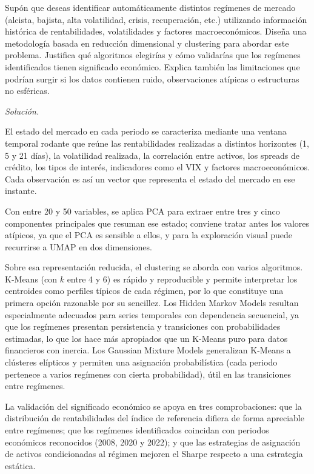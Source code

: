 \documentclass[12pt]{article}
\newcommand\sol[1]{\begin{mdframed}
\emph{Solución.} #1
\end{mdframed}}
\begin{document}
\begin{enumerate}
Supón que deseas identificar automáticamente distintos regímenes de mercado (alcista, bajista, alta
volatilidad, crisis, recuperación, etc.) utilizando información histórica de rentabilidades,
volatilidades y factores macroeconómicos. Diseña una metodología basada en reducción dimensional y
clustering para abordar este problema. Justifica qué algoritmos elegirías y cómo validarías que los
regímenes identificados tienen significado económico. Explica también las limitaciones que podrían
surgir si los datos contienen ruido, observaciones atípicas o estructuras no esféricas.

\sol{

El estado del mercado en cada periodo se caracteriza mediante una ventana temporal rodante que reúne
las rentabilidades realizadas a distintos horizontes (1, 5 y 21 días), la volatilidad realizada, la
correlación entre activos, los spreads de crédito, los tipos de interés, indicadores
como el VIX y factores macroeconómicos. Cada observación es así un vector que representa el estado del
mercado en ese instante.

\medskip
Con entre 20 y 50 variables, se aplica PCA para extraer entre tres y cinco componentes principales que
resuman ese estado; conviene tratar antes los valores atípicos, ya que el PCA es sensible a ellos, y
para la exploración visual puede recurrirse a UMAP en dos dimensiones.

\medskip
Sobre esa representación reducida, el clustering se aborda con varios algoritmos. K-Means
(con $k$ entre 4 y 6) es rápido y reproducible y permite interpretar los centroides como perfiles típicos de
cada régimen, por lo que constituye una primera opción razonable por su sencillez. Los Hidden Markov
Models resultan especialmente adecuados para series temporales con dependencia secuencial, ya que los
regímenes presentan persistencia y transiciones con probabilidades estimadas, lo que los hace más
apropiados que un K-Means puro para datos financieros con inercia. Los Gaussian Mixture Models
generalizan K-Means a clústeres elípticos y permiten una asignación probabilística (cada periodo
pertenece a varios regímenes con cierta probabilidad), útil en las transiciones entre regímenes.

\medskip
La validación del significado económico se apoya en tres comprobaciones: que la distribución de
rentabilidades del índice de referencia difiera de forma apreciable entre regímenes; que los
regímenes identificados coincidan con periodos económicos reconocidos (2008, 2020 y 2022); y que
las estrategias de asignación de activos condicionadas al régimen mejoren el Sharpe respecto a una
estrategia estática.

}
\end{enumerate}
\end{document}
